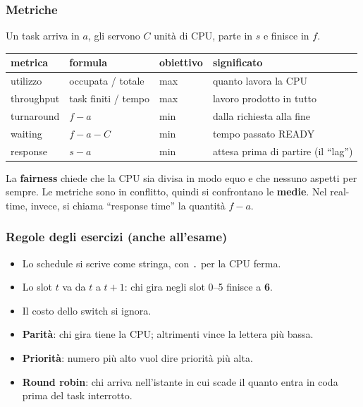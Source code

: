 \subsubsection*{Metriche}
Un task arriva in $a$, gli servono $C$ unità di CPU, parte in $s$ e finisce in $f$.
\begin{center}
    \begin{tabular}{l l l l}
        \hline
        \textbf{metrica} & \textbf{formula} & \textbf{obiettivo} & \textbf{significato} \\
        \hline
        utilizzo & occupata / totale & max & quanto lavora la CPU \\
        throughput & task finiti / tempo & max & lavoro prodotto in tutto \\
        turnaround & $f-a$ & min & dalla richiesta alla fine \\
        waiting & $f-a-C$ & min & tempo passato READY \\
        response & $s-a$ & min & attesa prima di partire (il ``lag'') \\
        \hline
    \end{tabular}
\end{center}
La \textbf{fairness} chiede che la CPU sia divisa in modo equo e che nessuno aspetti per sempre. Le metriche sono in conflitto, quindi si confrontano le \textbf{medie}. Nel real-time, invece, si chiama ``response time'' la quantità $f-a$.

\subsubsection*{Regole degli esercizi (anche all'esame)}
\begin{itemize}
    \item Lo schedule si scrive come stringa, con \texttt{.} per la CPU ferma.
    \item Lo slot $t$ va da $t$ a $t+1$: chi gira negli slot 0--5 finisce a \textbf{6}.
    \item Il costo dello switch si ignora.
    \item \textbf{Parità}: chi gira tiene la CPU; altrimenti vince la lettera più bassa.
    \item \textbf{Priorità}: numero più alto vuol dire priorità più alta.
    \item \textbf{Round robin}: chi arriva nell'istante in cui scade il quanto entra in coda prima del task interrotto.
\end{itemize}

